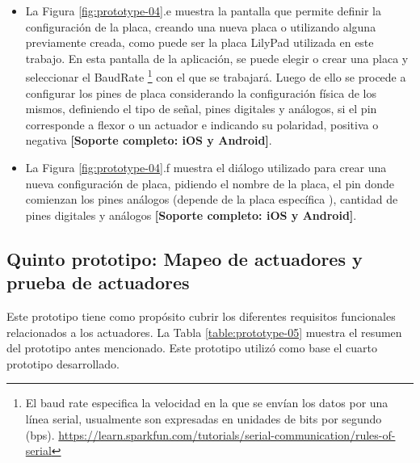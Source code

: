 \begin{itemize}
\item La Figura \ref{fig:prototype-04}.e muestra la pantalla que permite definir la configuración de la placa, creando una nueva placa o utilizando alguna previamente creada, como puede ser la placa LilyPad utilizada en este trabajo. En esta pantalla de la aplicación, se puede elegir o crear una placa y seleccionar el BaudRate \footnote{El baud rate especifica la velocidad en la que se envían los datos por una línea serial, usualmente son expresadas en unidades de bits por segundo (bps). \url{https://learn.sparkfun.com/tutorials/serial-communication/rules-of-serial}
} con el que se trabajará. Luego de ello se procede a configurar los pines de placa considerando la configuración física de los mismos, definiendo el tipo de señal, pines digitales y análogos, si el pin corresponde a flexor o un actuador e indicando su polaridad, positiva o negativa \textbf{[Soporte completo: iOS y Android]}.

\item La Figura \ref{fig:prototype-04}.f muestra el diálogo utilizado para crear una nueva configuración de placa, pidiendo el nombre de la placa, el pin donde comienzan los pines análogos (depende de la placa específica \citep{tesis-cerda-rodrigo}), cantidad de pines digitales y análogos \textbf{[Soporte completo: iOS y Android]}.

\end{itemize}






\subsection{Quinto  prototipo: Mapeo de actuadores y prueba de actuadores}
\label{quinto-prototipo}
Este prototipo tiene como propósito cubrir los diferentes requisitos funcionales relacionados a los actuadores.  La Tabla \ref{table:prototype-05} muestra el resumen del prototipo antes mencionado. Este prototipo utilizó como base el cuarto prototipo desarrollado.


